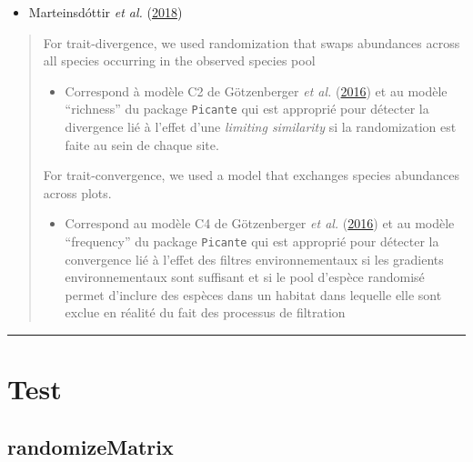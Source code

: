 \documentclass[]{article}
\providecommand{\tightlist}{%
  \setlength{\itemsep}{0pt}\setlength{\parskip}{0pt}}
\begin{document}
\begin{itemize}
\tightlist
\item
  Marteinsdóttir \emph{et al.}
  (\protect\hyperlink{ref-marteinsdottir2018}{2018})
\end{itemize}

\begin{quote}
For trait-divergence, we used randomization that swaps abundances across
all species occurring in the observed species pool

\begin{itemize}
\tightlist
\item
  Correspond à modèle C2 de Götzenberger \emph{et al.}
  (\protect\hyperlink{ref-gotzenberger2016randomizations}{2016}) et au
  modèle ``richness'' du package \texttt{Picante} qui est approprié pour
  détecter la divergence lié à l'effet d'une \emph{limiting similarity}
  si la randomization est faite au sein de chaque site.
\end{itemize}

For trait-convergence, we used a model that exchanges species abundances
across plots.

\begin{itemize}
\tightlist
\item
  Correspond au modèle C4 de Götzenberger \emph{et al.}
  (\protect\hyperlink{ref-gotzenberger2016randomizations}{2016}) et au
  modèle ``frequency'' du package \texttt{Picante} qui est approprié
  pour détecter la convergence lié à l'effet des filtres
  environnementaux si les gradients environnementaux sont suffisant et
  si le pool d'espèce randomisé permet d'inclure des espèces dans un
  habitat dans lequelle elle sont exclue en réalité du fait des
  processus de filtration
\end{itemize}
\end{quote}

\begin{center}\rule{0.5\linewidth}{\linethickness}\end{center}

\hypertarget{test}{\section{Test}\label{test}}

\subsection{randomizeMatrix}\label{randomizematrix}
\end{document}
